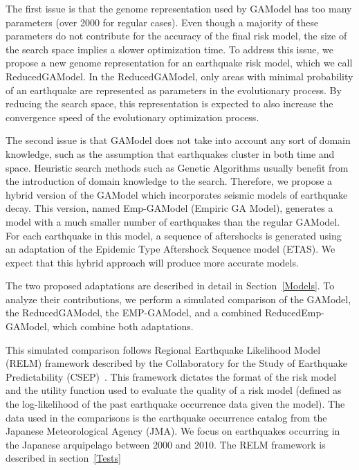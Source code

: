 The first issue is that the genome representation used by GAModel has
too many parameters (over 2000 for regular cases). Even though a
majority of these parameters do not contribute for the accuracy of the
final risk model, the size of the search space implies a slower
optimization time. To address this issue, we propose a new genome
representation for an earthquake risk model, which we call
ReducedGAModel. In the ReducedGAModel, only areas with minimal
probability of an earthquake are represented as parameters in the
evolutionary process. By reducing the search space, this
representation is expected to also increase the convergence speed of
the evolutionary optimization process.

The second issue is that GAModel does not take into account any sort
of domain knowledge, such as the assumption that earthquakes cluster
in both time and space. Heuristic search methods such as Genetic
Algorithms usually benefit from the introduction of domain knowledge
to the search. Therefore, we propose a hybrid version of the GAModel
which incorporates seismic models of earthquake decay. This version,
named Emp-GAModel (Empiric GA Model), generates a model with a much
smaller number of earthquakes than the regular GAModel. For each
earthquake in this model, a sequence of aftershocks is generated using
an adaptation of the Epidemic Type Aftershock Sequence model
(ETAS). We expect that this hybrid approach will produce more accurate
models.

The two proposed adaptations are described in detail in
Section~\ref{Models}. To analyze their contributions, we perform a
simulated comparison of the GAModel, the ReducedGAModel, the
EMP-GAModel, and a combined ReducedEmp-GAModel, which combine both 
adaptations. 

This simulated comparison follows Regional Earthquake Likelihood Model
(RELM) framework described by the Collaboratory for the Study of
Earthquake Predictability
(CSEP)~\cite{schorlermmer2007earthquake}. This framework dictates the
format of the risk model and the utility function used to evaluate the
quality of a risk model (defined as the log-likelihood of the past
earthquake occurrence data given the model). The data used in the
comparisons is the earthquake occurrence catalog from the Japanese
Meteorological Agency (JMA). We focus on earthquakes occurring in the
Japanese arquipelago between 2000 and 2010. The RELM framework is
described in section~\ref{Tests}

